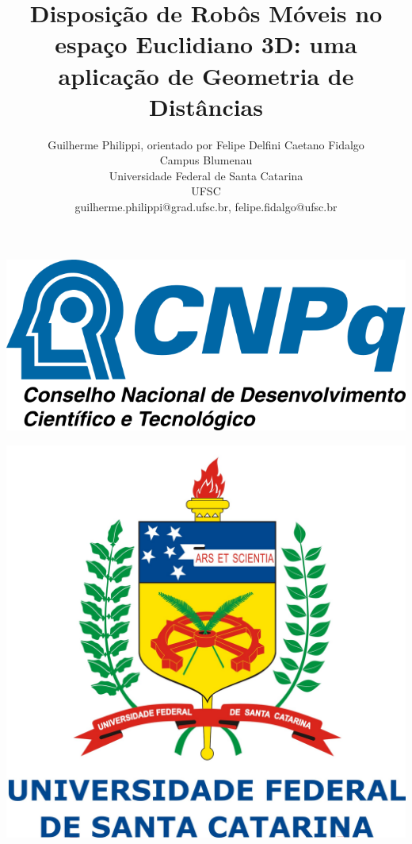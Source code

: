 \documentclass[a4paper,12pt]{report}
\title{Disposição de Robôs Móveis no espaço Euclidiano 3D: uma aplicação de Geometria de Distâncias}
\author{Guilherme Philippi\Mark{*}, orientado por Felipe Delfini Caetano Fidalgo\Mark{\dagger}\\Campus Blumenau\\Universidade Federal de Santa Catarina\\UFSC
	\\guilherme.philippi@grad.ufsc.br\Mark{*}, felipe.fidalgo@ufsc.br\Mark{\dagger}}
\theoremstyle{plain}
\theoremstyle{definition}
\begin{document}
	\begin{titlepage}
		\newcommand{\HRule}{\rule{\linewidth}{0.5mm}} %
		\center %
		\begin{flushright}
			\includegraphics[scale=0.35]{figures/cnpq-logo.png}	
		\end{flushright}
		\vspace{-2cm}
		\begin{center}
			\includegraphics[scale=0.22]{figures/logoufsc.jpg}
		\end{center}
		\vspace{1cm}
		

\end{titlepage}
\end{document}
